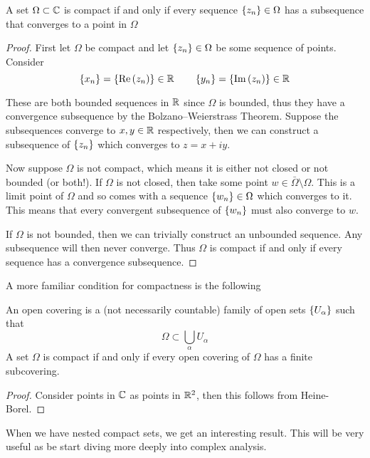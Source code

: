 \begin{theorem}
	A set $\Omega \subset \mathbb{C}$ is compact if and only if every sequence $\left\{z_n\right\} \in \Omega$ has a subsequence that converges to a point in $\Omega$
\end{theorem}
\begin{proof}
	First let $\Omega$ be compact and let $\left\{z_n\right\} \in \Omega$ be some sequence of points. Consider
	\[ \left\{x_n\right\} = \left\{\Re\left(z_n\right)\right\} \in \mathbb{R} \qquad \left\{y_n\right\} = \left\{\Im\left(z_n\right)\right\} \in \mathbb{R} \]
	
	These are both bounded sequences in $\mathbb{R}$ since $\Omega$ is bounded, thus they have a convergence subsequence by the Bolzano–Weierstrass Theorem. Suppose the subsequences converge to $x, y \in \mathbb{R}$ respectively, then we can construct a subsequence of $\left\{z_n\right\}$ which converges to $z = x + iy$. 
	
	Now suppose $\Omega$ is not compact, which means it is either not closed or not bounded (or both!). If $\Omega$ is not closed, then take some point $w \in \bar\Omega \setminus \Omega$. This is a limit point of $\Omega$ and so comes with a sequence $\left\{w_n\right\} \in \Omega$ which converges to it. This means that every convergent subsequence of $\left\{w_n\right\}$ must also converge to $w$. 
	
	If $\Omega$ is not bounded, then we can trivially construct an unbounded sequence. Any subsequence will then never converge. Thus $\Omega$ is compact if and only if every sequence has a convergence subsequence.
\end{proof}

A more familiar condition for compactness is the following

\begin{theorem}
	An open covering is a (not necessarily countable) family of open sets $\left\{U_\alpha\right\}$ such that
	\[ \Omega \subset \bigcup_\alpha U_\alpha \]
	A set $\Omega$ is compact if and only if every open covering of $\Omega$ has a finite subcovering. 
\end{theorem}
\begin{proof}
	Consider points in $\mathbb{C}$ as points in $\mathbb{R}^2$, then this follows from Heine-Borel.
\end{proof}

When we have nested compact sets, we get an interesting result. This will be very useful as be start diving more deeply into complex analysis.

